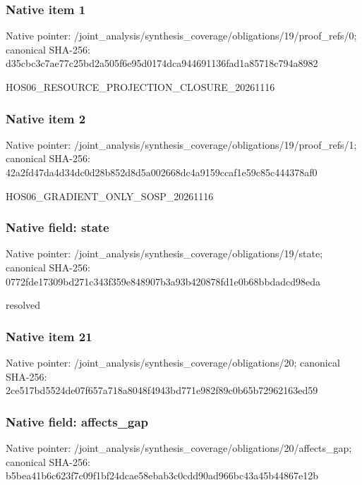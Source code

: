 \documentclass[10pt,a4paper]{article}
\begin{document}
\subsubsection{Native item 1}
Native pointer: /joint\_\allowbreak{}analysis/synthesis\_\allowbreak{}coverage/obligations/19/proof\_\allowbreak{}refs/0; canonical SHA-256: d35cbc3c7ae77c25bd2a505f6e95d0174dca944691136fad1a85718c794a8982

\begingroup\raggedright\sloppy HOS06\_\allowbreak{}RESOURCE\_\allowbreak{}PROJECTION\_\allowbreak{}CLOSURE\_\allowbreak{}20261116\par\endgroup

\subsubsection{Native item 2}
Native pointer: /joint\_\allowbreak{}analysis/synthesis\_\allowbreak{}coverage/obligations/19/proof\_\allowbreak{}refs/1; canonical SHA-256: 42a2fd47da4d34dc0d28b852d8d5a002668dc4a9159ccaf1e59c85c444378af0

\begingroup\raggedright\sloppy HOS06\_\allowbreak{}GRADIENT\_\allowbreak{}ONLY\_\allowbreak{}SOSP\_\allowbreak{}20261116\par\endgroup

\subsubsection{Native field: state}
Native pointer: /joint\_\allowbreak{}analysis/synthesis\_\allowbreak{}coverage/obligations/19/state; canonical SHA-256: 0772fde17309bd271c343f359e848907b3a93b420878fd1e0b68bbdadcd98eda

\begingroup\raggedright\sloppy resolved\par\endgroup

\subsubsection{Native item 21}
Native pointer: /joint\_\allowbreak{}analysis/synthesis\_\allowbreak{}coverage/obligations/20; canonical SHA-256: 2ce517bd5524de07f657a718a8048f4943bd771e982f89c0b65b72962163ed59

\subsubsection{Native field: affects\_\allowbreak{}gap}
Native pointer: /joint\_\allowbreak{}analysis/synthesis\_\allowbreak{}coverage/obligations/20/affects\_\allowbreak{}gap; canonical SHA-256: b5bea41b6c623f7c09f1bf24dcae58ebab3c0cdd90ad966bc43a45b44867e12b
\end{document}
